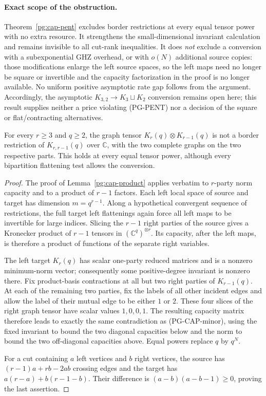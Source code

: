 \paragraph{Exact scope of the obstruction.}
Theorem~\ref{pg:cap-pent} excludes border restrictions at every
equal tensor power with no extra resource. It strengthens the
small-dimensional invariant calculation and remains invisible to all
cut-rank inequalities. It does \emph{not} exclude a conversion with
a subexponential GHZ overhead, or with $o(N)$ additional source
copies: those modifications enlarge the left source spaces, so the
left maps need no longer be square or invertible and the capacity
factorization in the proof is no longer available. No uniform
positive asymptotic rate gap follows from the argument. Accordingly,
the asymptotic $K_{3,2}\to K_3\sqcup K_2$ conversion remains open
here; this result supplies neither a price violating (PG-PENT) nor
a decision of the square or flat/contracting alternatives.

\begin{corollary}
\label{pg:cap-hyper}
For every $r\geq3$ and $q\geq2$, the graph tensor
$K_r(q)\otimes K_{r-1}(q)$ is not a border restriction of
$K_{r,r-1}(q)$ over $\mathbb C$, with the two complete graphs
on the two respective parts. This holds at every equal tensor power,
although every bipartition flattening test allows the conversion.
\end{corollary}
\begin{proof}
The proof of Lemma~\ref{pg:cap-product} applies verbatim to $r$-party
norm capacity and to a product of $r-1$ factors. Each left local
space of source and target has dimension $m=q^{r-1}$. Along a
hypothetical convergent sequence of restrictions, the full target
left flattenings again force all left maps to be invertible for
large indices. Slicing the $r-1$ right parties of the source gives
a Kronecker product of $r-1$ tensors in $(\mathbb C^q)^{\otimes r}$.
Its capacity, after the left maps, is therefore a product of
functions of the separate right variables.

The left target $K_r(q)$ has scalar one-party reduced matrices and
is a nonzero minimum-norm vector; consequently some positive-degree
invariant is nonzero there. Fix product-basis contractions at all
but two right parties of $K_{r-1}(q)$. At each of the remaining two
parties, fix the labels of all other incident edges and allow the
label of their mutual edge to be either $1$ or $2$. These four
slices of the right graph tensor have scalar values $1,0,0,1$.
The resulting capacity matrix therefore leads to exactly the same
contradiction as (PG-CAP-minor), using the fixed invariant to bound
the two diagonal capacities below and the norm to bound the two
off-diagonal capacities above. Equal powers replace $q$ by $q^N$.

For a cut containing $a$ left vertices and $b$ right vertices, the
source has $(r-1)a+rb-2ab$ crossing edges and the target has
$a(r-a)+b(r-1-b)$. Their difference is
$(a-b)(a-b-1)\geq0$, proving the last assertion.
\end{proof}

